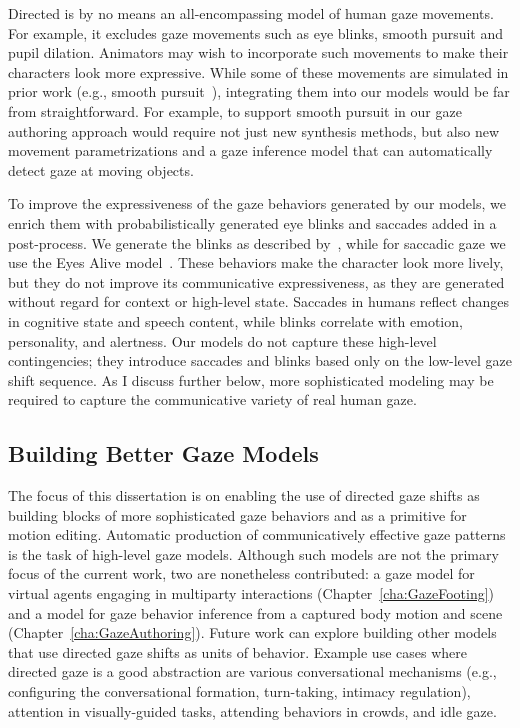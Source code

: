 Directed is by no means an all-encompassing model of human gaze movements. For example, it excludes gaze movements such as eye blinks, smooth pursuit and pupil dilation. Animators may wish to incorporate such movements to make their characters look more expressive. While some of these movements are simulated in prior work (e.g., smooth pursuit~\citep{yeo2012eyecatch}), integrating them into our models would be far from straightforward. For example, to support smooth pursuit in our gaze authoring approach would require not just new synthesis methods, but also new movement parametrizations and a gaze inference model that can automatically detect gaze at moving objects.

To improve the expressiveness of the gaze behaviors generated by our models, we enrich them with probabilistically generated eye blinks and saccades added in a post-process. We generate the blinks as described by~\citet{peters2010animating}, while for saccadic gaze we use the Eyes Alive model~\citep{lee2002eyes}. These behaviors make the character look more lively, but they do not improve its communicative expressiveness, as they are generated without regard for context or high-level state. Saccades in humans reflect changes in cognitive state and speech content, while blinks correlate with emotion, personality, and alertness. Our models do not capture these high-level contingencies; they introduce saccades and blinks based only on the low-level gaze shift sequence. As I discuss further below, more sophisticated modeling may be required to capture the communicative variety of real human gaze.

\subsection{Building Better Gaze Models}

The focus of this dissertation is on enabling the use of directed gaze shifts as building blocks of more sophisticated gaze behaviors and as a primitive for motion editing. Automatic production of communicatively effective gaze patterns is the task of high-level gaze models. Although such models are not the primary focus of the current work, two are nonetheless contributed: a gaze model for virtual agents engaging in multiparty interactions (Chapter~\ref{cha:GazeFooting}) and a model for gaze behavior inference from a captured body motion and scene (Chapter~\ref{cha:GazeAuthoring}). Future work can explore building other models that use directed gaze shifts as units of behavior. Example use cases where directed gaze is a good abstraction are various conversational mechanisms (e.g., configuring the conversational formation, turn-taking, intimacy regulation), attention in visually-guided tasks, attending behaviors in crowds, and idle gaze.

